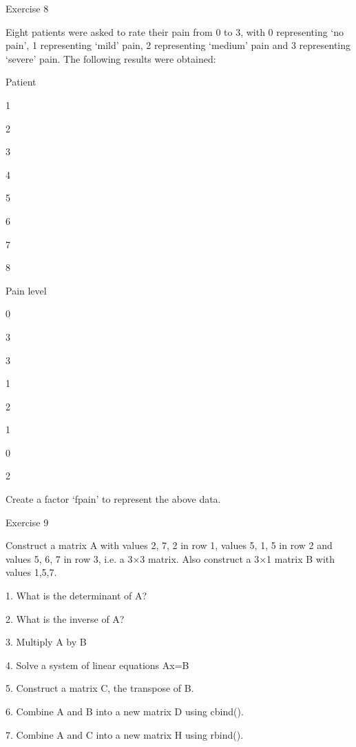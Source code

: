  

Exercise 8

 

Eight patients were asked to rate their pain from 0 to 3, with 0 representing `no pain', 1 representing `mild' pain, 2 representing `medium' pain and 3 representing `severe' pain. The following results were obtained:

 















Patient
 

1
 

2
 

3
 

4
 

5
 

6
 

7
 

8
 



Pain level
 

0
 

3
 

3
 

1
 

2
 

1
 

0
 

2
 

 

Create a factor ‘fpain’ to represent the above data.

 

Exercise 9

 

Construct a matrix A with values 2, 7, 2 in row 1, values 5, 1, 5 in row 2 and values 5, 6, 7 in row 3, i.e. a 3×3 matrix. Also construct a  3×1 matrix B with values 1,5,7. 

 
1.
What is the determinant of A?

2.
What is the inverse of A?

3.
Multiply A by B

4.
Solve a system of linear equations Ax=B

5.
Construct a matrix C, the transpose of B.

6.
Combine A and B into a new matrix D using cbind().

7.
Combine A and C into a new matrix H using rbind().


